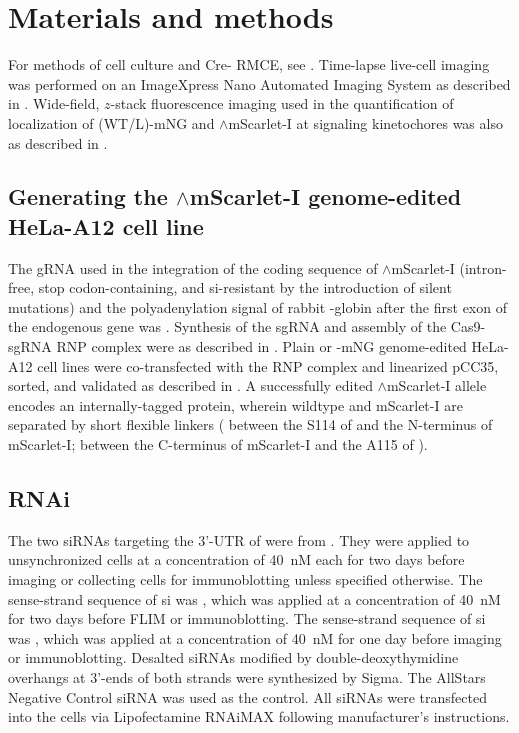 \section{Materials and methods}

For methods of cell culture and Cre- RMCE, see . Time-lapse live-cell imaging was performed on an ImageXpress Nano Automated Imaging System as described in . Wide-field, $z$-stack fluorescence imaging used in the quantification of localization of (WT/\textDelta{}L)-mNG and $\wedge$mScarlet-I at signaling kinetochores was also as described in .

\subsection{Generating the $\wedge$mScarlet-I genome-edited HeLa-A12 cell line}

The gRNA used in the integration of the coding sequence of $\wedge$mScarlet-I (intron-free, stop codon-containing, and si-resistant by the introduction of silent mutations) and the polyadenylation signal of rabbit \textbeta{}-globin after the first exon of the endogenous  gene was . Synthesis of the sgRNA and assembly of the Cas9-sgRNA RNP complex were as described in . Plain or -mNG genome-edited HeLa-A12 cell lines were co-transfected with the RNP complex and linearized pCC35, sorted, and validated as described in . A successfully edited $\wedge$mScarlet-I allele encodes an internally-tagged  protein, wherein wildtype  and mScarlet-I are separated by short flexible linkers ( between the S114 of  and the N-terminus of mScarlet-I;  between the C-terminus of mScarlet-I and the A115 of ).

\subsection{RNAi}

The two siRNAs targeting the 3'-UTR of  were from \cite{siMAD1-3UTR}. They were applied to unsynchronized cells at a concentration of \SI{40}{nM} each for two days before imaging or collecting cells for immunoblotting unless specified otherwise. The sense-strand sequence of si was  \cite{siCDC20}, which was applied at a concentration of \SI{40}{nM} for two days before FLIM or immunoblotting. The sense-strand sequence of si was  \cite{BubR1MitosisTurnover}, which was applied at a concentration of \SI{40}{nM} for one day before imaging or immunoblotting. Desalted siRNAs modified by double-deoxythymidine overhangs at 3'-ends of both strands were synthesized by Sigma. The AllStars Negative Control siRNA was used as the control. All siRNAs were transfected into the cells via Lipofectamine RNAiMAX following manufacturer’s instructions.

